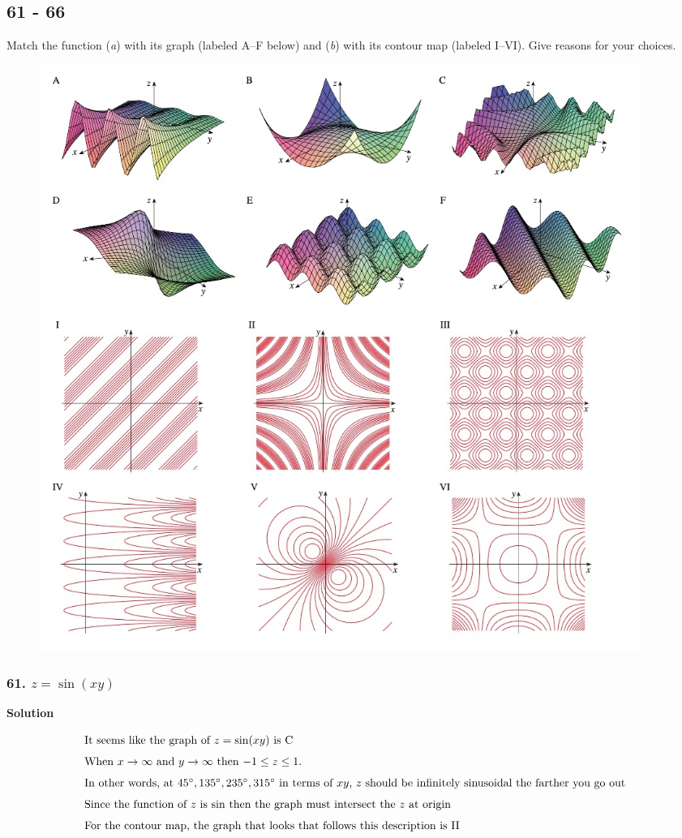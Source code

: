 \documentclass{article}
\begin{document}
\subsection*{61 - 66} 
Match the function (\textit a) with its graph (labeled A–F below) and (\textit b) with its contour map (labeled I–VI). Give reasons for your choices.

\begin{figure}[h] %
    \begin{center}
        \includegraphics[width=0.95\textwidth]{figures/61-66.jpg}
    \end{center}
\end{figure}

\subsubsection*{61. $z = \sin (xy)$}
\centerline{\textbf{Solution}}
\begin{align*}
    \intertext{It seems like the graph of $z = \sin (xy)$ is C}
    \intertext{When $x \to \infty$ and $y \to \infty$ then $-1 \leq z \leq 1$.}
    \intertext{In other words, at $45\degree, 135\degree, 235\degree, 315\degree$ in terms of $xy$, $z$ should be infinitely sinusoidal the farther you go out}
    \intertext{Since the function of $z$ is $\sin$ then the graph must intersect the $z$ at origin}
    \intertext{For the contour map, the graph that looks that follows this description is II}
\end{align*}
\end{document}
